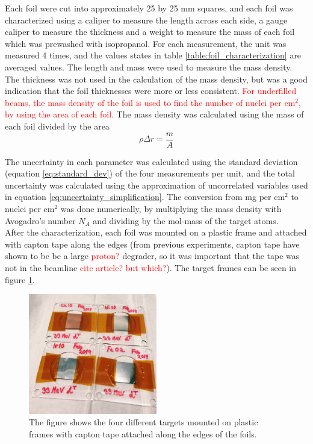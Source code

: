 \documentclass[a4paper,11pt,twoside]{book}
\begin{document}
\noindent 
Each foil were cut into approximately 25 by 25 mm squares, and each foil was characterized using a caliper to measure the length across each side, a gauge caliper to measure the thickness and a weight to measure the mass of each foil which was prewashed with isopropanol. For each measurement, the unit was measured 4 times, and the values states in table \ref{table:foil_characterization} are averaged values. The length and mass were used to measure the mass density. The thickness was not used in the
calculation of the mass density, but was a good indication that the foil thicknesses were more or less consistent.
\textcolor{red}{For underfilled beams, the mass density of the foil is used to find the number of nuclei per cm$^2$, by using the area of each foil.} The mass density was calculated using the mass of each foil divided by the area
\begin{equation}
    \rho \Delta r = \frac{m}{A}
\end{equation}

\noindent 
The uncertainty in each parameter was calculated using the standard deviation (equation \ref{eq:standard_dev}) of the four measurements per unit, and the total uncertainty was calculated using the approximation of uncorrelated variables used in equation \ref{eq:uncertainty_simplification}. The conversion from mg per cm$^2$ to nuclei per cm$^2$ was done numerically, by multiplying the mass density with Avogadro's number $N_A$ and dividing by the mol-mass of the target atoms. \\

\noindent 
After the characterization, each foil was mounted on a plastic frame and attached with capton tape along the edges (from previous experiments, capton tape have shown to be be a large \textcolor{red}{proton?} degrader, so it was important that the tape was not in the beamline \textcolor{red}{cite article? but which?}). The target frames can be seen in figure \ref{fig:targets_on_frame}. 

\begin{figure}
    \centering
    \includegraphics[width=0.5\textwidth]{Experiment/targets_on_frame.JPG}
    \caption{The figure shows the four different targets mounted on plastic frames with capton tape attached along the edges of the foils.}
    \label{fig:targets_on_frame}
\end{figure}
\end{document}
